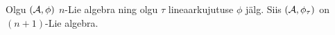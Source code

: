 \begin{thm}\label{thm:n+1_lie_alg}
    Olgu $(\mathcal{A}, \phi)$ $n$-Lie algebra ning olgu $\tau$ lineaarkujutuse
    $\phi$ jälg. Siis $(\mathcal{A}, \phi_\tau)$ on $(n+1)$-Lie algebra.
\end{thm}




